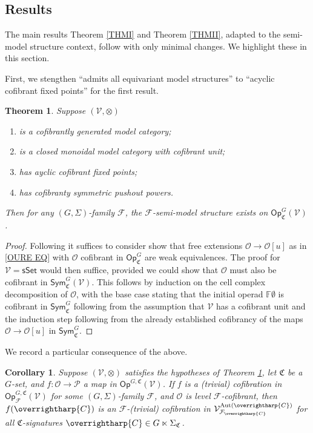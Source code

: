 \documentclass[a4paper,10pt
,draft
]{article}%
\numberwithin{equation}{section}
\numberwithin{figure}{section}
\newtheorem{theorem}[equation]{Theorem}%
\newtheorem{corollary}[equation]{Corollary}%
\theoremstyle{definition} %
\newcommand{\vect}[1]{\text{\overrightharp{\ensuremath{#1}}}}
\newcommand{\Sym}{\ensuremath{\mathsf{Sym}}}%
\newcommand{\sSet}{\ensuremath{\mathsf{sSet}}}%
\newcommand{\Op}{\mathsf{Op}}%
\DeclareMathOperator{\Aut}{Aut}%
\newcommand{\F}{\ensuremath{\mathcal F}}
\newcommand{\V}{\ensuremath{\mathcal V}}
\renewcommand{\O}{\ensuremath{\mathcal O}}
\renewcommand{\P}{\ensuremath{\mathcal P}}
\newcommand{\1}{\ensuremath{\mathbbm 1}}%
\begin{document}
\subsection{Results}

The main results Theorem \ref{THMI} and Theorem \ref{THMII}, adapted to the semi-model structure context, follow with only minimal changes.
We highlight these in this section.

First, we stengthen ``admits all equivariant model structures'' to ``acyclic cofibrant fixed points'' for the first result.
\begin{theorem}
      \label{THM1_S}
      Suppose $(\V,\otimes)$
      \begin{enumerate}[label = (\roman*)]
      \item is a cofibrantly generated model category;
      \item is a closed monoidal model category with cofibrant unit;
      \item has ayclic cofibrant fixed points;
      \item has cofibranty symmetric pushout powers.
      \end{enumerate}
      Then for any $(G, \Sigma)$-family $\F$,
      the $\F$-semi-model structure exists on $\Op^G_{\mathfrak C}(\V)$. 
\end{theorem}
\begin{proof}
      Following \cite[Thm. 2.2.2]{WY18} it suffices to consider show that free extensions $\O \to \O[u]$ as in \eqref{OURE EQ} with $\O$ cofibrant in $\mathsf{Op}^G_{\mathfrak C}$ are weak equivalences.
      The proof for $\V = \sSet$ would then suffice, provided we could show that $\O$ must also be cofibrant in $\Sym^G_{\mathfrak C}(\V)$.
      This follows by induction on the cell complex decomposition of $\O$,
      with the base case stating that the initial operad $\mathbb{F}\emptyset$ is cofibrant in $\mathsf{Sym}^G_{\mathfrak{C}}$
      following from the assumption that $\mathcal{V}$ has a cofibrant unit
      and the induction step following from the already established cofibrancy of the maps $\O \to \O[u]$ in $\mathsf{Sym}^G_{\mathfrak{C}}$.
\end{proof}

We record a particular consequence of the above.
\begin{corollary}
      \label{LGC_COR}
      Suppose $(\V, \otimes)$ satisfies the hypotheses of Theorem \ref{THM1_S},
      let $\mathfrak C$ be a $G$-set, and $f: \O \to \P$ a map in $\Op^{G,\mathfrak C}(\V)$.
      If $f$ is a (trivial) cofibration in $\Op^{G, \mathfrak C}_\F(\V)$ for some $(G, \Sigma)$-family $\F$,
      and $\O$ is level $\F$-cofibrant, then
      $f(\vect C)$ is an $\F$-(trivial) cofibration in $\V^{\Aut(\vect C)}_{\F_{\vect C}}$ for all $\mathfrak C$-signatures $\vect C \in G \ltimes \Sigma_{\mathfrak C}$.
\end{corollary}
\end{document}

